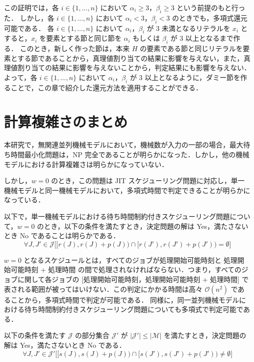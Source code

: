 \documentclass[12pt]{optlab-bachelor}
\begin{document}
この証明では，各 $i \in \{1,\ldots,n\}$ において $\alpha_i \ge 3$，$\beta_i \ge 3$ という前提のもと行った．
しかし，各 $i \in \{1,\ldots,n\}$ において $\alpha_i < 3$，$\beta_i < 3$ のときでも，多項式還元可能である．
各 $i \in \{1,\ldots,n\}$ において $\alpha_i$，$\beta_i$ が 3 未満となるリテラルを $x_i$ とすると，$x_i$ を要素とする節と同じ節を $\alpha_i$ もしくは $\beta_i$ が 3 以上となるまで作る．
このとき，新しく作った節は，本来 $H$ の要素である節と同じリテラルを要素とする節であることから，真理値割り当ての結果に影響を与えない，また，真理値割り当ての結果に影響を与えないことから，判定結果にも影響を与えない．
よって，各 $i \in \{1,\ldots,n\}$ において $\alpha_i$，$\beta_i$ が 3 以上となるように，ダミー節を作ることで，この章で紹介した還元方法を適用することができる．

\section{計算複雑さのまとめ}\label{4_s_2}
本研究で，無関連並列機械モデルにおいて，機械数が入力の一部の場合，最大待ち時間最小化問題は，NP 完全であることが明らかになった．しかし，他の機械モデルにおける計算複雑さは明らかになっていない．

しかし，$w = 0$ のとき，この問題は JIT スケジューリング問題に対応し，単一機械モデルと同一機械モデルにおいて，多項式時間で判定できることが明らかになっている．

以下で，単一機械モデルにおける待ち時間制約付きスケジューリング問題について，$w = 0$ のとき，以下の条件を満たすとき，決定問題の解は Yes，満たさないとき No であることは明らかである．
\begin{displaymath}
  \forall J,J' \in \mathcal{J}\bigg[\big[r(J),r(J) + p(J)\big) \cap \big[r(J'),r(J') + p(J')\big) = \emptyset\bigg]
\end{displaymath}

$w = 0$ となるスケジュールとは，すべてのジョブが処理開始可能時刻と 処理開始可能時刻 + 処理時間 の間で処理されなければならない．つまり，すべてのジョブに関して各ジョブの [処理開始可能時刻，処理開始可能時刻 + 処理時間] で表される範囲が被ってはいけない．この判定にかかる時間は高々 $\mathcal{O}(n^2)$ であることから，多項式時間で判定が可能である．
同様に，同一並列機械モデルにおける待ち時間制約付きスケジューリング問題についても多項式で判定可能である．

以下の条件を満たす $\mathcal{J}$ の部分集合 $\mathcal{J}'$ が $|\mathcal{J}'| \le |\mathcal{M}|$ を満たすとき，決定問題の解は Yes，満たさないとき No である．
\begin{displaymath}
  \forall J,J' \in \mathcal{J}'\bigg[\big[s(J),s(J) + p(J)\big) \cap \big[s(J'),s(J') + p(J')\big) \neq \emptyset\bigg]
\end{displaymath}
\end{document}
